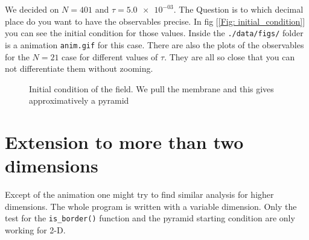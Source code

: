 \documentclass[11pt,a4paper]{article}
\begin{document}
We decided on $N = 401$ and $\tau = \num{5.0e-03}$. The Question is to which
decimal place do you want to have the observables precise. In fig [\ref{Fig:
initial_condition}] you can see the initial condition for those values. Inside
the \verb|./data/figs/| folder is a animation \verb|anim.gif| for this case.
There are also the plots of the observables for the $N = 21$ case for different
values of $\tau$. They are all so close that you can not differentiate them
without zooming.

\begin{figure}[H]
\centering
\caption{Initial condition of the field. We pull the membrane and this gives approximatively a pyramid}
\label{Fig: initial_condition}
\end{figure}

\section{Extension to more than two dimensions}

Except of the animation one might try to find similar analysis for higher
dimensions. The whole program is written with a variable dimension. Only the
test for the \verb|is_border()| function and the pyramid starting condition are
only working for 2-D.
\end{document}
